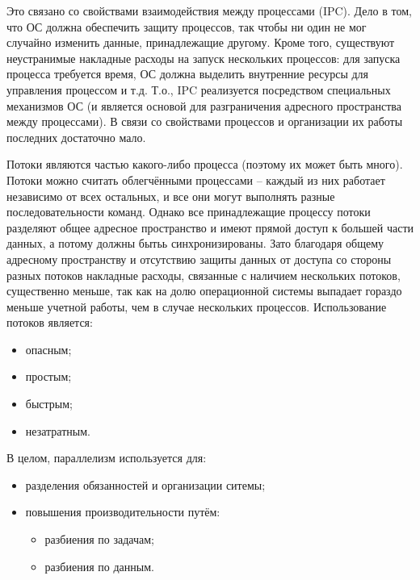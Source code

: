 \documentclass[a4paper,12pt]{article}	%
\begin{document}
	Это связано со свойствами взаимодействия между процессами (IPC). Дело в том, что ОС должна обеспечить защиту процессов, так чтобы ни один не мог случайно изменить данные, принадлежащие другому. Кроме того, существуют неустранимые накладные расходы на запуск нескольких процессов: для запуска процесса требуется время, ОС должна выделить внутренние ресурсы для управления процессом и т.д. Т.о., IPC реализуется посредством специальных механизмов ОС (и является основой для разграничения адресного пространства между процессами). В связи со свойствами процессов и организации их работы последних достаточно мало.
	
	Потоки являются частью какого-либо процесса (поэтому их может быть много). Потоки можно считать облегчёнными процессами -- каждый из них работает независимо от всех остальных, и все они могут выполнять разные последовательности команд. Однако все принадлежащие процессу потоки разделяют общее адресное пространство и имеют прямой доступ к большей части данных, а потому должны бытьь синхронизированы. Зато благодаря общему адресному пространству и отсутствию защиты данных от доступа со стороны разных потоков накладные расходы, связанные с наличием нескольких потоков, существенно меньше, так как на долю операционной системы выпадает гораздо меньше учетной работы, чем в случае нескольких процессов. Использование потоков является:
	
	\begin{itemize}
		
		\item опасным;
		\item простым;
		\item быстрым;
		\item незатратным.
	
	\end{itemize}
	
	В целом, параллелизм используется для:
	
	\begin{itemize}
	
		\item разделения обязанностей и организации ситемы;
		\item повышения производительности путём:
		
			\begin{itemize}
				
				\item разбиения по задачам;
				\item разбиения по данным.
										
			\end{itemize}				
	
	\end{itemize}
\end{document}
